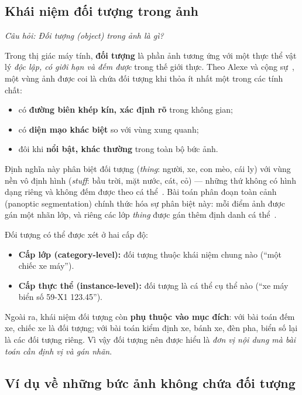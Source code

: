 \subsection{Khái niệm đối tượng trong ảnh}
\label{subsec:w1_object}

\textit{Câu hỏi: Đối tượng (object) trong ảnh là gì?}

Trong thị giác máy tính, \textbf{đối tượng} là phần ảnh tương ứng với một thực thể vật lý \emph{độc lập, có giới hạn và đếm được} trong thế giới thực. Theo Alexe và cộng sự~\citep{alexe2012measuring}, một vùng ảnh được coi là chứa đối tượng khi thỏa ít nhất một trong các tính chất:
\begin{itemize}
    \item có \textbf{đường biên khép kín, xác định rõ} trong không gian;
    \item có \textbf{diện mạo khác biệt} so với vùng xung quanh;
    \item đôi khi \textbf{nổi bật, khác thường} trong toàn bộ bức ảnh.
\end{itemize}

Định nghĩa này phân biệt đối tượng (\emph{thing}: người, xe, con mèo, cái ly) với vùng nền vô định hình (\emph{stuff}: bầu trời, mặt nước, cát, cỏ) — những thứ không có hình dạng riêng và không đếm được theo cá thể~\citep{heitz2008learning}. Bài toán phân đoạn toàn cảnh (panoptic segmentation) chính thức hóa sự phân biệt này: mỗi điểm ảnh được gán một nhãn lớp, và riêng các lớp \emph{thing} được gán thêm định danh cá thể~\citep{kirillov2019panoptic}.

Đối tượng có thể được xét ở hai cấp độ:
\begin{itemize}
    \item \textbf{Cấp lớp (category-level):} đối tượng thuộc khái niệm chung nào (``một chiếc xe máy'').
    \item \textbf{Cấp thực thể (instance-level):} đối tượng là cá thể cụ thể nào (``xe máy biển số 59-X1 123.45'').
\end{itemize}

Ngoài ra, khái niệm đối tượng còn \textbf{phụ thuộc vào mục đích}: với bài toán đếm xe, chiếc xe là đối tượng; với bài toán kiểm định xe, bánh xe, đèn pha, biển số lại là các đối tượng riêng. Vì vậy đối tượng nên được hiểu là \emph{đơn vị nội dung mà bài toán cần định vị và gán nhãn}.

\subsection{Ví dụ về những bức ảnh không chứa đối tượng}
\label{subsec:w1_noobject}

